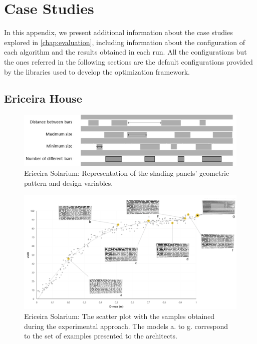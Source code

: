 \chapter{Case Studies}
\label{appendix:appendixB}

In this appendix, we present additional information about the case studies explored in \cref{chap:evaluation}, including information about the configuration of each algorithm and the results obtained in each run. All the configurations but the ones referred in the following sections are the default configurations provided by the libraries used to develop the optimization framework.

\section{Ericeira House}

\begin{figure}[htbp]
	\centering
	\includegraphics[width=\textwidth]{Images/Evaluation/Ericeira_1.jpg}
	\caption[Ericeira Solarium: Representation of the shading panels' geometric pattern and design variables]{Ericeira Solarium: Representation of the shading panels' geometric pattern and design variables.}
	\label{fig:ericeira_panels_explanation}
\end{figure}

\begin{figure}[htbp]
	\centering
	\includegraphics[width=\textwidth]{Images/Evaluation/Ericeira_caadria2018.PNG}
	\caption[Ericeira Solarium: The scatter plot with the samples obtained during the experimental approach]{Ericeira Solarium: The scatter plot with the samples obtained during the experimental approach. The models a. to g. correspond to the set of examples presented to the architects.}
	\label{fig:ericeira_doe}
\end{figure}


